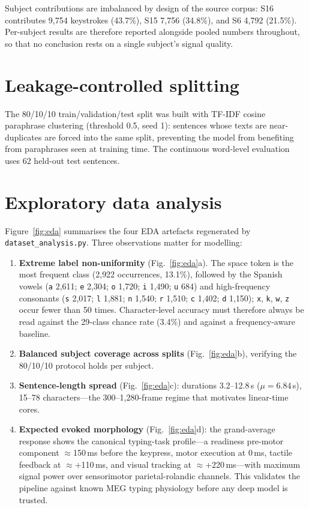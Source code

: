\documentclass[11pt,a4paper]{report}
\begin{document}
Subject contributions are imbalanced by design of the source corpus: S16
contributes 9{,}754 keystrokes (43.7\%), S15 7{,}756 (34.8\%), and S6 4{,}792
(21.5\%). Per-subject results are therefore reported alongside pooled numbers
throughout, so that no conclusion rests on a single subject's signal quality.

\section{Leakage-controlled splitting}
\label{sec:split}
The 80/10/10 train/validation/test split was built with TF-IDF cosine
paraphrase clustering (threshold 0.5, seed 1): sentences whose texts are
near-duplicates are forced into the same split, preventing the model from
benefiting from paraphrases seen at training time. The continuous word-level
evaluation uses 62 held-out test sentences.

\section{Exploratory data analysis}
\label{sec:eda}
Figure~\ref{fig:eda} summarises the four EDA artefacts regenerated by
\texttt{dataset\_analysis.py}. Three observations matter for modelling:

\begin{enumerate}
  \item \textbf{Extreme label non-uniformity}
  (Fig.~\ref{fig:eda}a). The space token is the most frequent class
  (2{,}922 occurrences, 13.1\%), followed by the Spanish vowels
  (\texttt{a} 2{,}611; \texttt{e} 2{,}304; \texttt{o} 1{,}720; \texttt{i}
  1{,}490; \texttt{u} 684) and high-frequency consonants (\texttt{s} 2{,}017;
  \texttt{l} 1{,}881; \texttt{n} 1{,}540; \texttt{r} 1{,}510; \texttt{c}
  1{,}402; \texttt{d} 1{,}150); \texttt{x}, \texttt{k}, \texttt{w},
  \texttt{z} occur fewer than 50 times. Character-level accuracy must
  therefore always be read against the 29-class chance rate (3.4\%) and
  against a frequency-aware baseline.
  \item \textbf{Balanced subject coverage across splits}
  (Fig.~\ref{fig:eda}b), verifying the 80/10/10 protocol holds per subject.
  \item \textbf{Sentence-length spread} (Fig.~\ref{fig:eda}c): durations
  3.2--12.8\,s ($\mu=6.84$\,s), 15--78 characters---the 300--1{,}280-frame
  regime that motivates linear-time cores.
  \item \textbf{Expected evoked morphology} (Fig.~\ref{fig:eda}d): the
  grand-average response shows the canonical typing-task profile---a
  readiness pre-motor component $\approx$150\,ms before the keypress, motor
  execution at 0\,ms, tactile feedback at $\approx$+110\,ms, and visual
  tracking at $\approx$+220\,ms---with maximum signal power over
  sensorimotor parietal-rolandic channels. This validates the pipeline
  against known MEG typing physiology before any deep model is trusted.
\end{enumerate}
\end{document}

